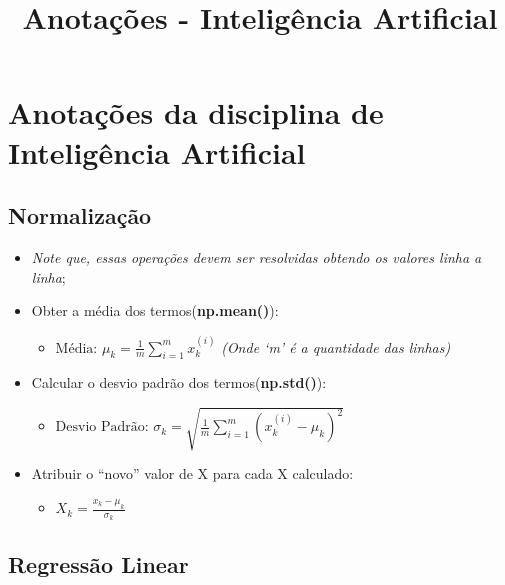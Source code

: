 \documentclass[12pt]{article}
\title{Anotações - Inteligência Artificial}
\providecommand{\tightlist}{%
\setlength{\itemsep}{0pt}\setlength{\parskip}{0pt}}
\begin{document}
    \hypertarget{anotauxe7uxf5es-da-disciplina-de-inteliguxeancia-artificial}{%
\section{\texorpdfstring{\textbf{Anotações da disciplina de Inteligência
Artificial}}{Anotações da disciplina de Inteligência Artificial}}\label{anotauxe7uxf5es-da-disciplina-de-inteliguxeancia-artificial}}

    \hypertarget{normalizauxe7uxe3o}{%
\subsection{\texorpdfstring{\textbf{Normalização}}{Normalização}}\label{normalizauxe7uxe3o}}

\begin{itemize}
\tightlist
\item
  \emph{Note que, essas operações devem ser resolvidas obtendo os
  valores linha a linha};
\item
  Obter a média dos termos(\textbf{np.mean()}):

  \begin{itemize}
  \tightlist
  \item
    \(\text{Média: }\mu_k=\frac{1}{m}\sum\limits_{i=1}^{m}x_k^{(i)}\)
    \emph{(Onde `m' é a quantidade das linhas)}
  \end{itemize}
\item
  Calcular o desvio padrão dos termos(\textbf{np.std()}):

  \begin{itemize}
  \tightlist
  \item
    \(\text{Desvio Padrão: }\sigma_k=\sqrt{\frac{1}{m}\sum\limits_{i=1}^{m}(x_k^{(i)}-\mu_k)^2}\)
  \end{itemize}
\item
  Atribuir o ``novo'' valor de X para cada X calculado:

  \begin{itemize}
  \tightlist
  \item
    \(X_k=\frac{x_k-\mu_k}{\sigma_k}\)
  \end{itemize}
\end{itemize}

    \hypertarget{regressuxe3o-linear}{%
\subsection{\texorpdfstring{\textbf{Regressão
Linear}}{Regressão Linear}}\label{regressuxe3o-linear}}
\end{document}
